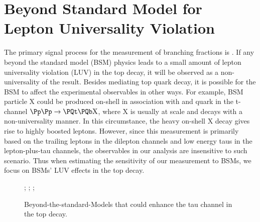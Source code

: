 

\section{Beyond Standard Model for Lepton Universality Violation}
\label{sec:physics:bsm}

The primary signal process for the measurement of \PW branching fractions is \ttbar. If any beyond the standard model (BSM) physics leads to a small amount of lepton universality violation (LUV) in the top decay, it will be observed as a non-universality of the \BWl result. Besides mediating top quark decay, it is possible for the BSM to affect the experimental observables in other ways. For example, BSM particle \textrm{X} could be produced on-shell in association with \PQt and \PQb quark in the t-channel $\Pp\Pp \to \PQt \PQb \mathrm{X}$, where \textrm{X} is usually at \TeV scale and decays with a non-universality manner. In this circumstance, the heavy on-shell \textrm{X} decay gives rise to highly boosted leptons. However, since this \BWl measurement is primarily based on the trailing leptons in the dilepton channels and low energy taus in the lepton-plus-tau channels, the observables in our analysis are insensitive to such scenario. Thus when estimating the sensitivity of our measurement to BSMs, we focus on BSMs' LUV effects in the top decay. 

\begin{figure}[ht]
    \centering
    ;\qquad
    ;\qquad
    ;
    \caption{Beyond-the-standard-Models that could enhance the tau channel in the top decay. }
   \label{fig:physics:bsm:topdecayBSM}
\end{figure}

